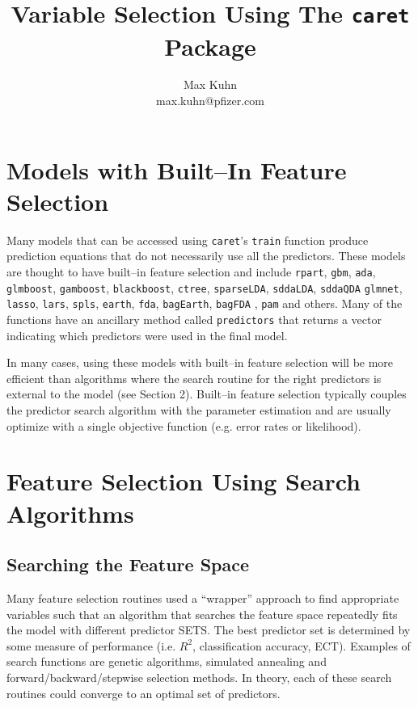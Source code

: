 \documentclass[12pt]{article}
\title{Variable Selection Using The {\tt caret} Package}
\author{Max Kuhn \\ max.kuhn@pfizer.com}
\begin{document}
\maketitle

\thispagestyle{empty}

\section{Models with Built--In Feature Selection}

Many models that can be accessed using \texttt{caret}'s \texttt{train} function produce prediction equations that do not necessarily use all the predictors. These models are thought to have built--in feature selection and include \texttt{rpart}, \texttt{gbm}, \texttt{ada}, \texttt{glmboost}, \texttt{gamboost}, \texttt{blackboost}, \texttt{ctree}, \texttt{sparseLDA}, \texttt{sddaLDA}, \texttt{sddaQDA}	\texttt{glmnet}, \texttt{lasso}, \texttt{lars}, \texttt{spls}, \texttt{earth}, \texttt{fda},   \texttt{bagEarth}, \texttt{bagFDA} , \texttt{pam} and others. Many of the functions have an ancillary method called \texttt{predictors} that returns a vector indicating which predictors were used in the final model.

In many cases, using these models with built--in feature selection will be more efficient than algorithms where the search routine for the right predictors is external to the model (see Section 2). Built--in feature selection typically couples the predictor search algorithm with the parameter  estimation and are usually optimize with a single objective function (e.g. error rates or likelihood). 


\section{Feature Selection Using Search Algorithms}

\subsection{Searching the Feature Space}

Many feature selection routines used a ``wrapper'' approach to find appropriate variables such that an algorithm that searches the feature space repeatedly fits the model with different predictor SETS. The best predictor set is determined by some measure of performance (i.e. $R^2$, classification accuracy, ECT). Examples of search functions are genetic algorithms, simulated annealing and forward/backward/stepwise selection methods. In theory, each of these search routines could converge to an optimal set of predictors.
\end{document}
